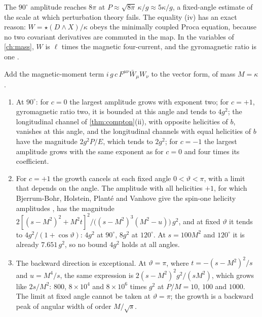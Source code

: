 The $90^\circ$ amplitude reaches $8\pi$ at $P\approx\sqrt{8\pi}\,\kappa/g\approx5\kappa/g$, a fixed-angle estimate of the scale at which
perturbation theory fails. The equality (iv) has an exact reason: $W=\star(D\wedge X)/\kappa$ obeys the minimally coupled Proca equation,
because no two covariant derivatives are commuted in the map. In the variables of \cref{ch:mass}, $W$ is $\ell$ times the magnetic
four-current, and the gyromagnetic ratio is one \cite{LeeYang62,Holstein2006}.

\begin{proposition}
\label{prop:moment}
Add the magnetic-moment term $i\,g\,c\,F^{\mu\nu}\bar W_\mu W_\nu$ to the vector form, of mass $M=\kappa$.
\begin{enumerate}[label=(\roman*),leftmargin=2.2em,itemsep=1pt]
\item At $90^\circ$: for $c=0$ the largest amplitude grows with exponent two; for $c=+1$, gyromagnetic ratio two, it is bounded at this
angle and tends to $4g^2$; the longitudinal channel of \cref{thm:compton}(ii), with opposite helicities of $b$, vanishes at this angle, and
the longitudinal channels with equal helicities of $b$ have the magnitude $2g^2P/E$, which tends to $2g^2$; for $c=-1$ the largest amplitude grows
with the same exponent as for $c=0$ and four times its coefficient.
\item For $c=+1$ the growth cancels at each fixed angle $0<\vartheta<\pi$, with a limit that depends on the angle. The amplitude with all
helicities $+1$, for which Bjerrum-Bohr, Holstein, Plant\'e and Vanhove give the spin-one helicity amplitudes
\cite[Appendix~A]{BjerrumBohr2015}, has the magnitude $2[(s-M^2)^2+M^2t]^2/\bigl((s-M^2)^3(M^2-u)\bigr)\,g^2$, and at fixed $\vartheta$ it tends to
$4g^2/(1+\cos\vartheta)$: $4g^2$ at $90^\circ$, $8g^2$ at $120^\circ$. At $s=100M^2$ and $120^\circ$ it is already $7.651\,g^2$, so no bound
$4g^2$ holds at all angles.
\item The backward direction is exceptional. At $\vartheta=\pi$, where $t=-(s-M^2)^2/s$ and $u=M^4/s$, the same expression is
$2(s-M^2)^2g^2/(sM^2)$, which grows like $2s/M^2$: $800$, $8\times10^4$ and $8\times10^6$ times $g^2$ at $P/M=10$, $100$ and $1000$. The
limit at fixed angle cannot be taken at $\vartheta=\pi$; the growth is a backward peak of angular width of order $M/\sqrt s$.
\end{enumerate}
\end{proposition}

